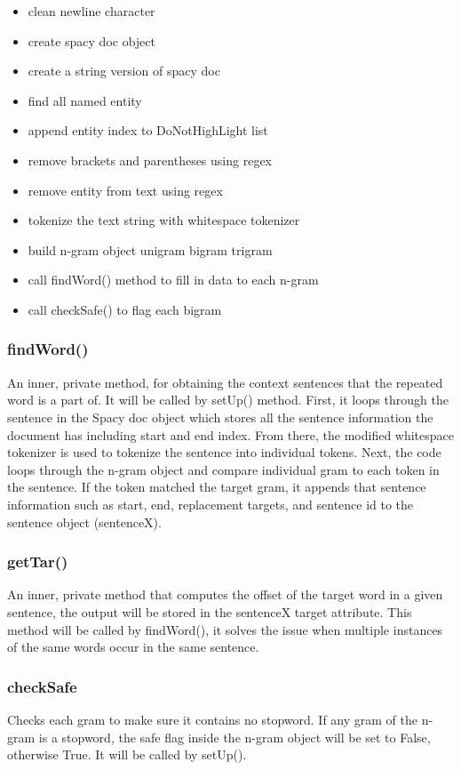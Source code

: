 \documentclass[12pt,oneside,openright,a4paper]{cpe-english-project}
\begin{document}
\begin{itemize}
\item clean newline character
\item create spacy doc object
\item create a string version of spacy doc
\item find all named entity
\item append entity index to DoNotHighLight list
\item remove brackets and parentheses using regex
\item remove entity from text using regex
\item tokenize the text string with whitespace tokenizer
\item build n-gram object unigram bigram trigram
\item call findWord() method to fill in data to each n-gram
\item call checkSafe() to flag each bigram 
\end{itemize}

\subsubsection{ findWord()} 
An inner, private method, for obtaining the context sentences that the repeated word is a part of. It will be called by setUp() method. First, it loops through the sentence in the Spacy doc object which stores all the sentence information the document has including start and end index. From there, the modified whitespace tokenizer is used to tokenize the sentence into individual tokens. Next, the code loops through the n-gram object and compare individual gram to each token in the sentence. If the token matched the target gram, it appends that sentence information such as start, end, replacement targets, and sentence id to the sentence object (sentenceX).

\subsubsection{getTar() }
An inner, private method that computes the offset of the target word in a given sentence, the output will be stored in the sentenceX target attribute. This method will be called by findWord(), it solves the issue when multiple instances of the same words occur in the same sentence.

\subsubsection{checkSafe}
Checks each gram to make sure it contains no stopword. If any gram of the n-gram is a stopword, the safe flag inside the n-gram object will be set to False, otherwise True. It will be called by setUp().
\end{document}
